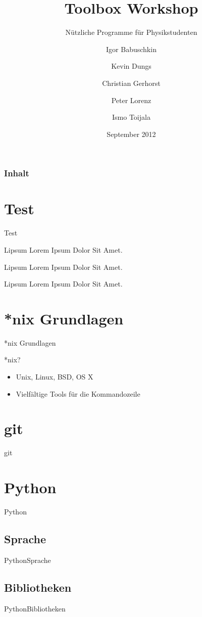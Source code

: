 \documentclass[t]{beamer}
\title{Toolbox Workshop}
\subtitle{Nützliche Programme für Physikstudenten}
\author[Igor B.\and Kevin D.\and Christian G.\and Peter L.\and Ismo T.]{
  Igor Babuschkin%
  \and Kevin Dungs%
  \and Christian Gerhorst%
  \and Peter Lorenz%
  \and Ismo Toijala%
}
\institute[PeP et al. e.V.]{PeP et al. e.V.\thanks{\href{http://pep-dortmund.org}{pep-dortmund.org}}}
\date{September 2012}
\begin{document}
{
  \begin{frame}
    \titlepage
  \end{frame}
}

  \begin{frame}
    \frametitle{Inhalt}
    \tableofcontents
  \end{frame}

  \section{Test}
  \begin{frame}{Test}
    \begin{block}{Lipsum}
      Lorem Ipsum Dolor Sit Amet.
    \end{block}

    \begin{alertblock}{Lipsum}
      Lorem Ipsum Dolor Sit Amet.
    \end{alertblock}

    \begin{exampleblock}{Lipsum}
      Lorem Ipsum Dolor Sit Amet.
    \end{exampleblock}
  \end{frame}

  \section{*nix Grundlagen}
    \begin{frame}{*nix Grundlagen}
      \begin{block}{*nix?}
      \begin{itemize}
        \item{Unix, Linux, BSD, OS X}
        \item{Vielfältige Tools für die Kommandozeile}
      \end{itemize}
      \end{block}
    \end{frame}

  \section{git}
    \begin{frame}{git}
    \end{frame}

  \section{Python}
    \begin{frame}{Python}
    \end{frame}

    \subsection{Sprache}
      \begin{frame}{Python}{Sprache}
      \end{frame}

    \subsection{Bibliotheken}
      \begin{frame}{Python}{Bibliotheken}
      \end{frame}
\end{document}

